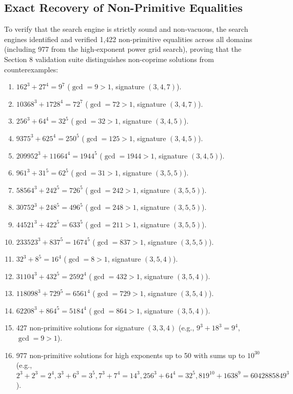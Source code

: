 \documentclass[11pt,reqno]{amsart}
\theoremstyle{definition}
\theoremstyle{remark}
\numberwithin{equation}{section}
\begin{document}
\subsection{Exact Recovery of Non-Primitive Equalities}
To verify that the search engine is strictly sound and non-vacuous, the search engines identified and verified 1,422 non-primitive equalities across all domains (including 977 from the high-exponent power grid search), proving that the Section 8 validation suite distinguishes non-coprime solutions from counterexamples:
\begin{enumerate}
    \item $162^3 + 27^4 = 9^7$ ($\gcd = 9 > 1$, signature $(3, 4, 7)$).
    \item $10368^3 + 1728^4 = 72^7$ ($\gcd = 72 > 1$, signature $(3, 4, 7)$).
    \item $256^3 + 64^4 = 32^5$ ($\gcd = 32 > 1$, signature $(3, 4, 5)$).
    \item $9375^3 + 625^4 = 250^5$ ($\gcd = 125 > 1$, signature $(3, 4, 5)$).
    \item $209952^3 + 11664^4 = 1944^5$ ($\gcd = 1944 > 1$, signature $(3, 4, 5)$).
    \item $961^3 + 31^5 = 62^5$ ($\gcd = 31 > 1$, signature $(3, 5, 5)$).
    \item $58564^3 + 242^5 = 726^5$ ($\gcd = 242 > 1$, signature $(3, 5, 5)$).
    \item $30752^3 + 248^5 = 496^5$ ($\gcd = 248 > 1$, signature $(3, 5, 5)$).
    \item $44521^3 + 422^5 = 633^5$ ($\gcd = 211 > 1$, signature $(3, 5, 5)$).
    \item $233523^3 + 837^5 = 1674^5$ ($\gcd = 837 > 1$, signature $(3, 5, 5)$).
    \item $32^3 + 8^5 = 16^4$ ($\gcd = 8 > 1$, signature $(3, 5, 4)$).
    \item $31104^3 + 432^5 = 2592^4$ ($\gcd = 432 > 1$, signature $(3, 5, 4)$).
    \item $118098^3 + 729^5 = 6561^4$ ($\gcd = 729 > 1$, signature $(3, 5, 4)$).
    \item $62208^3 + 864^5 = 5184^4$ ($\gcd = 864 > 1$, signature $(3, 5, 4)$).
    \item 427 non-primitive solutions for signature $(3, 3, 4)$ (e.g., $9^3 + 18^3 = 9^4$, $\gcd = 9 > 1$).
    \item 977 non-primitive solutions for high exponents up to 50 with sums up to $10^{30}$ (e.g., $2^3 + 2^3 = 2^4, 3^3 + 6^3 = 3^5, 7^3 + 7^4 = 14^3, 256^3 + 64^4 = 32^5, 819^{10} + 1638^9 = 6042885849^3$).
\end{enumerate}
\end{document}
